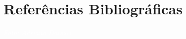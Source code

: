 \documentclass[11pt,fleqn]{book} %
\begin{document}
%

\chapter*{Referências Bibliográficas}
\vspace{6em}
\begin{flushright}
	\textit{\textcolor{white}{Foto: Adriano Darosci}}
\end{flushright}
\vspace{12em}
\printbibliography[heading=bibempty]



%
\end{document}
